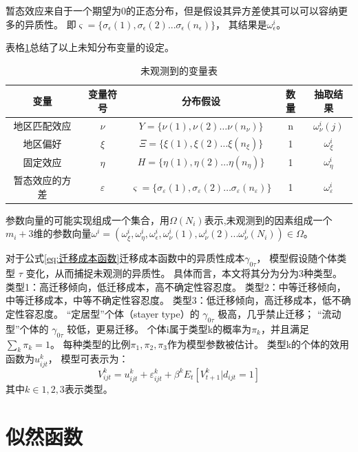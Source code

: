 \documentclass[a4paper,12pt,oneside]{book} %
\begin{document}
暂态效应来自于一个期望为$0$的正态分布，但是假设其异方差使其可以可以容纳更多的异质性。
即$\varsigma=\{\sigma_{\epsilon}(1),\sigma_{\epsilon}(2)...\sigma_{\epsilon}(n_{\epsilon})\}$，
其结果是$\omega^{i}_{\epsilon}$。




表格\ref{tab:未观测到的变量表}总结了以上未知分布变量的设定。


\begin{table}[!ht]
\centering
\begin{tabular}{@{}ccccc@{}}
\toprule
变量 & 变量符号 & 分布假设 & 数量 & 抽取结果 \\ \midrule
地区匹配效应 & $\nu$ & $Y=\{\nu(1),\nu(2)\ldots\nu(n_{\nu})\}$ & n & $\omega^{i}_{\nu}(j)$\\
地区偏好 & $\xi$ & $\Xi=\{\xi(1),\xi(2)\ldots\xi(n_{\xi})\}$ & 1 & $\omega^{i}_{\xi}$ \\
固定效应 & $\eta$ & $H=\{\eta(1),\eta(2)\ldots\eta(n_\eta)\}$ & 1 & $\omega^{i}_{\eta}$ \\
暂态效应的方差 & $\varepsilon$ & $\varsigma=\{\sigma_{\varepsilon}(1),\sigma_{\varepsilon}(2)\ldots\sigma_{\varepsilon}(n_{\varepsilon})\}$ & 1 & $\omega^{i}_{\varepsilon}$ \\ \bottomrule
\end{tabular}
\caption{未观测到的变量表}
\label{tab:未观测到的变量表}
\end{table}


参数向量的可能实现组成一个集合，用$\Omega(N_{i})$表示,未观测到的因素组成一个$m_{i}+3$维的参数向量$\omega^{i}=(\omega^{i}_{\xi},\omega^{i}_{\eta},\omega^{i}_{\epsilon},\omega^{i}_{\nu}(1),\omega^{i}_{\nu}(2)...\omega^{i}_{\nu}(N_{i}))\in \Omega$。


对于公式\ref{eq:迁移成本函数}迁移成本函数中的异质性成本$\gamma_{0\tau}$，
模型假设随个体类型 $\tau$ 变化，从而捕捉未观测的异质性。
具体而言，本文将其分为分为3种类型。
类型1：高迁移倾向，低迁移成本，高不确定性容忍度。
类型2：中等迁移倾向，中等迁移成本，中等不确定性容忍度。
类型3：低迁移倾向，高迁移成本，低不确定性容忍度。
“定居型”个体（stayer type）的 $\gamma_{0\tau}$ 极高，几乎禁止迁移；
“流动型”个体的 $\gamma_{0\tau}$ 较低，更易迁移。
个体i属于类型k的概率为$\pi_k$，并且满足$\sum\limits_{k}^{} \pi_k = 1$。
每种类型的比例$\pi_1, \pi_2, \pi_3$作为模型参数被估计。
类型k的个体的效用函数为$u_{ijt}^k$，
模型可表示为：
$$V_{ijt}^k = u_{ijt}^k + \varepsilon_{ijt}^k + \beta^k E_t[V_{t+1}^k|d_{ijt}=1]$$
其中$k\in{1,2,3}$表示类型。


\section{似然函数}
\end{document}
